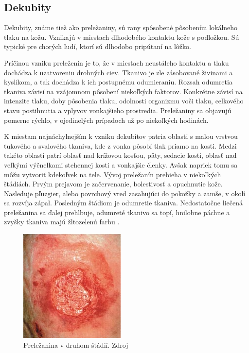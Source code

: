 \subsection{Dekubity}
Dekubity, známe tiež ako preležaniny, sú rany spôsobené pôsobením lokálneho tlaku na kožu. Vznikajú v miestach dlhodobého kontaktu kože s podložkou. Sú typické pre chorých ľudí, ktorí sú dlhodobo pripútaní na lôžko.

Príčinou vzniku preleženín je to, že v miestach neustáleho kontaktu a tlaku dochádza k uzatvoreniu drobných ciev. Tkanivo je zle zásobované živinami a kyslíkom, a tak dochádza k ich postupnému odumieraniu. Rozsah odumretia tkaniva závisí na vzájomnom pôsobení niekoľkých faktorov. Konkrétne závisí na intenzite tlaku, doby pôsobenia tlaku, odolnosti organizmu voči tlaku, celkového stavu postihnutia a vplyvov vonkajšieho prostredia. Preležaniny sa objavujú pomerne rýchlo, v ojedinelých prípadoch už po niekoľkých hodinách.

K miestam najnáchylnejším k vzniku dekubitov patria oblasti s malou vrstvou tukového a svalového tkaniva, kde z vonka pôsobí tlak priamo na kosti. Medzi takéto oblasti patrí oblasť nad krížovou kosťou, päty, sedacie kosti, oblasť nad veľkými výčnelkami stehennej kosti a vonkajšie členky. Avšak napriek tomu sa môžu vytvoriť kdekoľvek na tele. Vývoj preležanín prebieha v niekoľkých štádiách. Prvým prejavom je začervenanie, bolestivosť a opuchnutie kože. Nasleduje pľuzgier, alebo povrchový vred zasahujúci do pokožky a zamše, v okolí sa rozvíja zápal. Posledným štádiom je odumretie tkaniva. Nedostatočne liečená preležanina sa ďalej prehlbuje, odumreté tkanivo sa topí, hnilobne páchne a zvyšky tkaniva majú žltozelenú farbu \cite{pcCdSrbbhhlr5YcQ, Hlinkova2015}.
\begin{figure}[h]
  \centering
  \includegraphics[scale=1]{fig/dekubit.png}
  \caption{Preležanina v druhom štádií. Zdroj \cite{Vilimovsky2015}}
  \label{fig:dekubit}
\end{figure}

